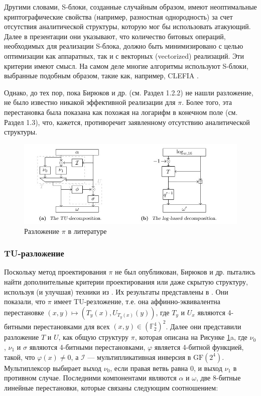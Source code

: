 Другими словами, S-блоки, созданные случайным образом, имеют неоптимальные криптографические свойства (например, разностная однородность) за счет отсутствия аналитической структуры, которую мог бы использовать атакующий. Далее в презентации они указывают, что количество битовых операций, необходимых для реализации S-блока, должно быть минимизировано с целью оптимизации как аппаратных, так и с векторных (vectorized) реализаций. Эти критерии имеют смысл. На самом деле многие алгоритмы используют S-блоки, выбранные подобным образом, такие как, например, CLEFIA \cite{SSA+07}.

Однако, до тех пор, пока Бирюков и др. \cite{BPU16a} (см. Раздел 1.2.2) не нашли разложение, не было известно никакой эффективной реализации для \(\pi\). Более того, эта перестановка была показана как похожая на логарифм в конечном поле \cite{PU16} (см. Раздел 1.3), что, кажется, противоречит заявленному отсутствию аналитической структуры.

\begin{figure}
        \centering
        \includegraphics[scale=0.9]{contents/pics/decomposite.png}
        \caption{Разложение \(\pi\) в литературе}
        \label{fig:fig01}
\end{figure}

\subsubsection{TU-разложение}
Поскольку метод проектирования \(\pi\) не был опубликован, Бирюков и др. пытались найти дополнительные критерии проектирования или даже скрытую структуру, используя (и улучшая) техники из \cite{BP15}. Их результаты представлены в \cite{BPU16a, BPU16b}. Они показали, что \(\pi\) имеет TU-резложение, т.е. она аффинно-эквивалентна перестановке \((x, y) \mapsto (T_y(x), U_{T_y(x)}(y))\), где \(T_y\) и \(U_x\) являются 4-битными перестановками для всех \((x, y) \in (\mathbb{F}_2^4)^2\). Далее они представили разложение \(T\) и \(U\), как общую структуру \(\pi\), которая описана на Рисунке \ref{fig:fig01}a, где \(\nu_0\), \(\nu_1\) и \(\sigma\) являются 4-битными перестановками, \(\varphi\) является 4-битной функцией, такой, что \(\varphi(x) \neq 0\), а \(\mathcal{I}\) — мультипликативная инверсия в \(\text{GF}(2^4)\). Мультиплексор выбирает выход \(\nu_0\), если правая ветвь равна 0, и выход \(\nu_1\) в противном случае. Последними компонентами являются \(\alpha\) и \(\omega\), две 8-битные линейные перестановки, которые связаны следующим соотношением:

